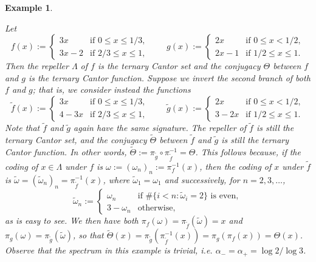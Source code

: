 \documentclass[11pt]{amsart}
\newcommand{\1}{1}
\newtheorem{example}[theorem]{Example}
\begin{document}
\begin{example} \label{ex:conjugacy}
{\rm
Let
\[
f(x):=\begin{cases} 3x & \mbox{if $0\leq x\leq 1/3$},\\
3x-2 & \mbox{if $2/3\leq x\leq 1$}, 
\end{cases}
\qquad
g(x):=\begin{cases} 2x & \mbox{if $0\leq x<1/2$},\\
2x-1 & \mbox{if $1/2\leq x\leq 1$}.
\end{cases}
\]
Then the repeller $\Lambda$ of $f$ is the ternary Cantor set and the conjugacy $\Theta$ between $f$ and $g$ is the ternary Cantor function.
Suppose we invert the second branch of both $f$ and $g$; that is, we consider instead the functions
\[
\tilde{f}(x):=\begin{cases} 3x & \mbox{if $0\leq x\leq 1/3$},\\
4-3x & \mbox{if $2/3\leq x\leq 1$}, 
\end{cases}
\qquad
\tilde{g}(x):=\begin{cases} 2x & \mbox{if $0\leq x<1/2$},\\
3-2x & \mbox{if $1/2\leq x\leq 1$}.
\end{cases}
\]
Note that $\tilde{f}$ and $\tilde{g}$ again have the same signature.
The repeller of $\tilde{f}$ is still the ternary Cantor set, and the conjugacy $\tilde{\Theta}$ between $\tilde{f}$ and $\tilde{g}$ is still the ternary Cantor function. In other words, $\tilde{\Theta}:=\pi_{\tilde g}\circ\pi_{\tilde{f}}^{-1}=\Theta$. This follows because, if the coding of $x\in\Lambda$ under $f$ is $\omega:=(\omega_n)_n:=\pi_f^{-1}(x)$, then the coding of $x$ under $\tilde{f}$ is $\tilde{\omega}=(\tilde{\omega}_n)_n=\pi_{\tilde f}^{-1}(x)$, where $\tilde{\omega}_1=\omega_1$ and successively, for $n=2,3,\dots$,
\[
\tilde{\omega}_n:=\begin{cases}
\omega_n & \mbox{if $\#\{i<n: \tilde{\omega}_i=2\}$ is even},\\
3-\omega_n & \mbox{otherwise},
\end{cases}
\]
as is easy to see. We then have both $\pi_f(\omega)=\pi_{\tilde f}(\tilde{\omega})=x$ and $\pi_g(\omega)=\pi_{\tilde g}(\tilde{\omega})$, so that $\tilde{\Theta}(x)=\pi_{\tilde g}(\pi_{\tilde f}^{-1}(x)) =\pi_g(\pi_f(x))=\Theta(x)$. Observe that the spectrum in this example is trivial, i.e.  $\alpha_-=\alpha_+=\log 2/\log 3$.

}
\end{example}
\end{document}
